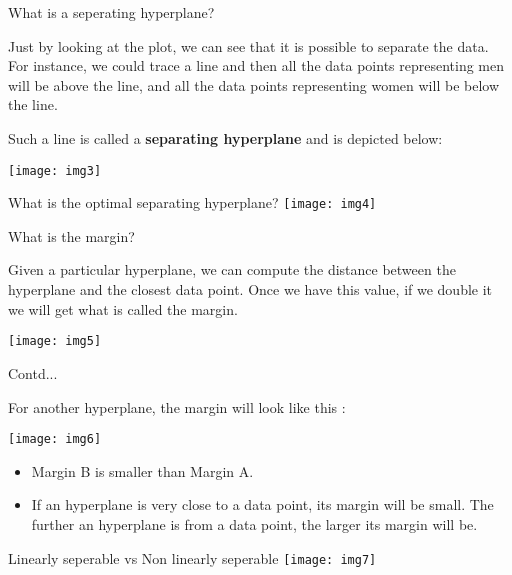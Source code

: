 \documentclass{beamer}
\begin{document}
\begin{frame}{What is a seperating hyperplane?}
\begin{flushleft}
	Just by looking at the plot, we can see that it is possible to separate the data.  For instance, we could trace a line and then all the data points representing men will be above the line, and all the data points representing women will be below the line.

\vspace{10pt}
Such a line is called a \textbf{separating hyperplane} and is depicted below:
\end{flushleft}
	\texttt{[image: img3]}
\end{frame}

\begin{frame}{What is the optimal separating hyperplane?}
	\texttt{[image: img4]}
\end{frame}

\begin{frame}{What is the margin?}
	\begin{flushleft}
		Given a particular hyperplane, we can compute the distance between the hyperplane and the closest data point. Once we have this value, if we double it we will get what is called the margin.
	\end{flushleft}
	\texttt{[image: img5]}
\end{frame}

\begin{frame}{Contd...}
\begin{flushleft}
	For another hyperplane, the margin will look like this :
\end{flushleft}
	\texttt{[image: img6]}
	\begin{flushleft}
	\begin{itemize}
		\item Margin B is smaller than Margin A.  
		\item If an hyperplane is very close to a data point, its margin will be small. The further an hyperplane is from a data point, the larger its margin will be.
	\end{itemize}
	\end{flushleft}
\end{frame}

\begin{frame}{Linearly seperable vs Non linearly seperable}
\texttt{[image: img7]}
\end{frame}
\end{document}

